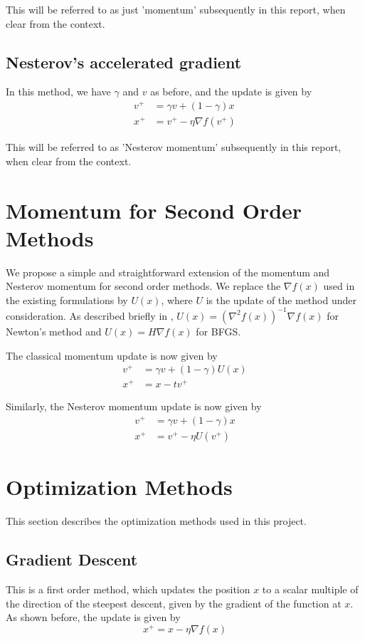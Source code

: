 \documentclass{article}
\begin{document}
This will be referred to as just 'momentum' subsequently in this report, when clear from the context.

\subsection{Nesterov's accelerated gradient}
In this method, we have $\gamma$ and $v$ as before, and the update is given by
\begin{align}
v^+ &= \gamma v + (1-\gamma)x \\
x^+ &= v^+ - \eta \nabla f(v^+)
\end{align}

This will be referred to as 'Nesterov momentum' subsequently in this report, when clear from the context.


\section{Momentum for Second Order Methods}\label{methodology}

We propose a simple and straightforward extension of the momentum and Nesterov momentum for second order methods. We replace the $\nabla f(x)$ used in the existing formulations by $U(x)$, where $U$ is the update of the method under consideration. As described briefly in \label{opt}, $U(x)=\left(\nabla^2 f(x) \right)^{-1}\nabla f(x)$ for Newton's method and $U(x)=H \nabla f(x)$ for BFGS.

The classical momentum update is now given by
\begin{align*}
v^{+} &= \gamma v + (1-\gamma) U(x) \\
x^{+} &= x - tv^{+}
\end{align*}

Similarly, the Nesterov momentum update is now given by
\begin{align}
v^+ &= \gamma v + (1-\gamma)x \\
x^+ &= v^+ - \eta U(v^+)
\end{align}

\section{Optimization Methods}\label{opt}
This section describes the optimization methods used in this project.

\subsection{Gradient Descent}
This is a first order method, which updates the position $x$ to a scalar multiple of the direction of the steepest descent, given by the gradient of the function at $x$. As shown before, the update is given by
\begin{equation}
x^+ = x - \eta \nabla f(x)
\end{equation}
\end{document}
